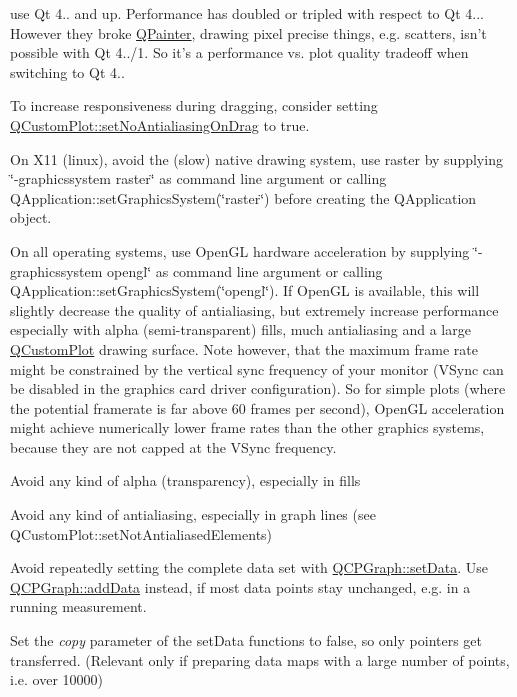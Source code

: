 \begin{DoxyItemize}
\item use Qt 4.. and up. Performance has doubled or tripled with respect to Qt 4... However they broke \hyperlink{a00060}{Q\+Painter}, drawing pixel precise things, e.\+g. scatters, isn't possible with Qt 4../1. So it's a performance vs. plot quality tradeoff when switching to Qt 4.. \item To increase responsiveness during dragging, consider setting \hyperlink{a00116_a775bdcb6329d44701aeaa6135b0e5265}{Q\+Custom\+Plot\+::set\+No\+Antialiasing\+On\+Drag} to true. \item On X11 (linux), avoid the (slow) native drawing system, use raster by supplying \char`\"{}-\/graphicssystem raster\char`\"{} as command line argument or calling Q\+Application\+::set\+Graphics\+System(\char`\"{}raster\char`\"{}) before creating the Q\+Application object. \item On all operating systems, use Open\+G\+L hardware acceleration by supplying \char`\"{}-\/graphicssystem
opengl\char`\"{} as command line argument or calling Q\+Application\+::set\+Graphics\+System(\char`\"{}opengl\char`\"{}). If Open\+G\+L is available, this will slightly decrease the quality of antialiasing, but extremely increase performance especially with alpha (semi-\/transparent) fills, much antialiasing and a large \hyperlink{a00030_d8/d00/a00186}{Q\+Custom\+Plot} drawing surface. Note however, that the maximum frame rate might be constrained by the vertical sync frequency of your monitor (V\+Sync can be disabled in the graphics card driver configuration). So for simple plots (where the potential framerate is far above 60 frames per second), Open\+G\+L acceleration might achieve numerically lower frame rates than the other graphics systems, because they are not capped at the V\+Sync frequency. \item Avoid any kind of alpha (transparency), especially in fills \item Avoid any kind of antialiasing, especially in graph lines (see Q\+Custom\+Plot\+::set\+Not\+Antialiased\+Elements) \item Avoid repeatedly setting the complete data set with \hyperlink{a00031_a1df2fd710545c8ba3b2c99a39a27bf8b}{Q\+C\+P\+Graph\+::set\+Data}. Use \hyperlink{a00031_aa5c6181d84db72ce4dbe9dc15a34ef4f}{Q\+C\+P\+Graph\+::add\+Data} instead, if most data points stay unchanged, e.\+g. in a running measurement. \item Set the {\itshape copy} parameter of the set\+Data functions to false, so only pointers get transferred. (Relevant only if preparing data maps with a large number of points, i.\+e. over 10000) \end{DoxyItemize}
